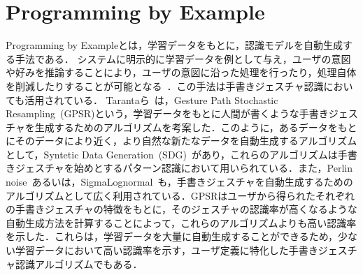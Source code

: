 \section{Programming by Example}
Programming by Exampleとは，学習データをもとに，認識モデルを自動生成する手法である．
システムに明示的に学習データを例として与え，ユーザの意図や好みを推論することにより，ユーザの意図に沿った処理を行ったり，処理自体を削減したりすることが可能となる~\cite{110003743975}．この手法は手書きジェスチャ認識においても活用されている．
Tarantaら~\cite{Taranta:2016:RPA:2984511.2984525}は，Gesture Path Stochastic Resampling~(GPSR)という，学習データをもとに人間が書くような手書きジェスチャを生成するためのアルゴリズムを考案した．このように，あるデータをもとにそのデータにより近く，より自然な新たなデータを自動生成するアルゴリズムとして，Syntetic Data Generation~(SDG)~\cite{conf/iccv/NavaratnamFC07,Shotton:2011:RHP:2191740.2192047,Galbally_syntheticgeneration,Lundin:2002:SFD:646280.687684,Gatos:2005:SAK:1106779.1106876,Rodriguez-Serrano:2012:SQH:2240326.2240755,Fischer:2013:GLS:2501115.2501123}があり，これらのアルゴリズムは手書きジェスチャを始めとするパターン認識において用いられている．また，Perlin noise~\cite{Perlin:1985:IS:325165.325247}あるいは，SigmaLognormal~\cite{SigmaLognormal}も，手書きジェスチャを自動生成するためのアルゴリズムとして広く利用されている．GPSRはユーザから得られたそれぞれの手書きジェスチャの特徴をもとに，そのジェスチャの認識率が高くなるような自動生成方法を計算することによって，これらのアルゴリズムよりも高い認識率を示した．これらは，学習データを大量に自動生成することができるため，少ない学習データにおいて高い認識率を示す，ユーザ定義に特化した手書きジェスチャ認識アルゴリズムでもある．

